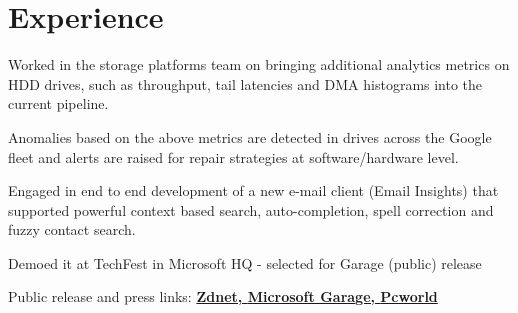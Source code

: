 \documentclass[]{resume-openfont}
\begin{document}
\hfill
\begin{minipage}[t]{0.74\textwidth} 


\section{Experience}

\vspace{\topsep} %
\begin{tightemize}
\item Worked in the storage platforms team on bringing additional analytics metrics on HDD drives, such as throughput, tail latencies and DMA histograms into the current pipeline.
\item Anomalies based on the above metrics are detected in drives across the Google fleet and alerts are raised for repair strategies at software/hardware level.
\end{tightemize}
\sectionsep


\begin{tightemize}
\item Engaged in end to end development of a new e-mail client (Email Insights) that supported powerful context based search, auto-completion, spell correction and fuzzy contact search. 
\item Demoed it at TechFest in Microsoft HQ - selected for Garage (public) release
\item Public release and press links: 
\textbf{\href{http://www.zdnet.com/product/email-insights/}{Zdnet, }}
\textbf{\href{https://www.microsoft.com/en-us/garage/profiles/email-insights/}{Microsoft Garage, }}
\textbf{\href{http://www.pcworld.com/article/3170146/windows/microsofts-email-insights-finally-adds-some-useful-search-smarts-to-outlook.html}{Pcworld}}


\end{tightemize}
\end{minipage}
\end{document}
